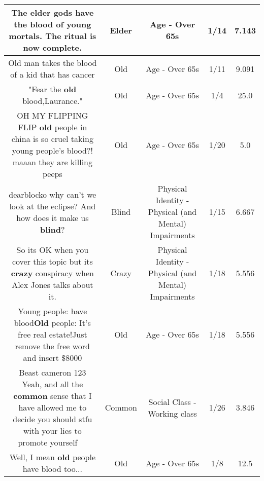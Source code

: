 \documentclass[11pt]{article}
\newlength\mylength
\begin{document}
\begin{center}
\begin{longtable}{|C{.65\mylength}|C{.30\mylength}|C{.12\mylength}|C{.12\mylength}|C{.12\mylength}|}
  \small The \textbf{elder} gods have the blood of young mortals. The ritual is now complete.\normalsize   & Elder & Age - Over 65s & 1/14 & 7.143 \\  \hline
  \small Old man takes the blood of a kid that has cancer\normalsize   & Old & Age - Over 65s & 1/11 & 9.091 \\  \hline
  \small "Fear the \textbf{old} blood,Laurance."\normalsize   & Old & Age - Over 65s & 1/4 & 25.0 \\  \hline
  \small OH MY FLIPPING FLIP   \textbf{old} people in china is so cruel taking young people's blood?!    maaan they are killing peeps\normalsize   & Old & Age - Over 65s & 1/20 & 5.0 \\  \hline
  \small dearblocko why can't we look at the eclipse? And how does it make us \textbf{blind}?\normalsize   & Blind & Physical Identity - Physical (and Mental) Impairments & 1/15 & 6.667 \\  \hline
  \small So its OK when you cover this topic but its \textbf{crazy} conspiracy when Alex Jones talks about it.\normalsize   & Crazy & Physical Identity - Physical (and Mental) Impairments & 1/18 & 5.556 \\  \hline
  \small Young people: have blood\textbf{Old} people: It's free real estate!Just remove the free word and insert \$8000\normalsize   & Old & Age - Over 65s & 1/18 & 5.556 \\  \hline
  \small Beast cameron 123 Yeah, and all the \textbf{common} sense that I have allowed me to decide you should stfu with your lies to promote yourself 🤷🏾‍♀️\normalsize   & Common & Social Class - Working class & 1/26 & 3.846 \\  \hline
  \small Well, I mean \textbf{old} people have blood too...\normalsize   & Old & Age - Over 65s & 1/8 & 12.5 \\  \hline

\end{longtable}
\end{center}
\end{document}
